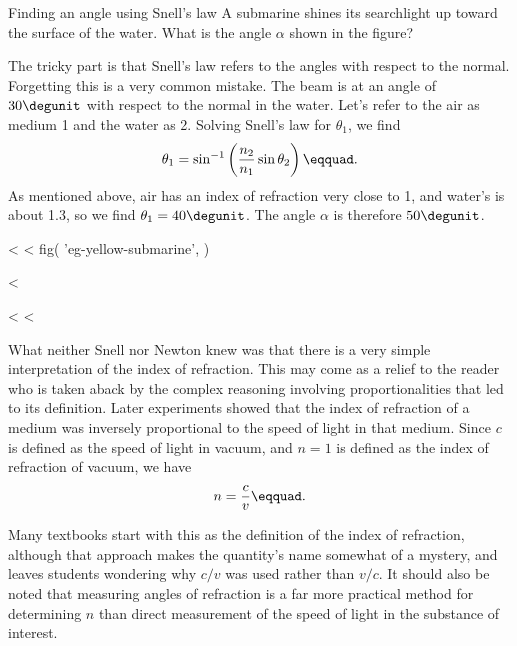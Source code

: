 \begin{eg}{Finding an angle using Snell's law}\label{eg:yellow-submarine}
\egquestion A submarine shines its searchlight up toward the
surface of the water. What is the angle $\alpha $ shown in the figure?

\eganswer The tricky part is that Snell's law refers to the
angles with respect to the normal. Forgetting this is a very
common mistake. The beam is at an angle of $30\degunit$ with
respect to the normal in the water. Let's refer to the air
as medium 1 and the water as 2. Solving Snell's law
for $\theta_1$, we find
\begin{equation*}
                \theta_1         = \sin^{-1}\left(\frac{n_2}{n_1}\sin\theta_2\right)\eqquad.
\end{equation*}
As mentioned above, air has an index of refraction very
close to 1, and water's is about 1.3, so we find $\theta_1=40\degunit$.
The angle $\alpha $ is therefore $50\degunit$.
\end{eg}
<%
<%
  fig(
    'eg-yellow-submarine',
  )

<%

<%
<%

What neither Snell nor Newton knew was that there is a very
simple interpretation of the index of refraction. This may
come as a relief to the reader who is taken aback by the
complex reasoning involving proportionalities that led to
its definition. Later experiments showed that the index of
refraction of a medium was inversely proportional to the
speed of light in that medium. Since $c$ is defined as the
speed of light in vacuum, and $n=1$ is defined as the index
of refraction of vacuum, we have
\begin{equation*}
        n=\frac{c}{v}\eqquad.
\end{equation*}
\begin{longnoteafterequation}
[$n=$ medium's index of refraction, $v=$ speed of
light in that medium, $c=$ speed of light in a vacuum]
\end{longnoteafterequation}

Many textbooks start with this as the definition of the
index of refraction, although that approach makes the
quantity's name somewhat of a mystery, and leaves students
wondering why $c/v$ was used rather than $v/c$. It should
also be noted that measuring angles of refraction is a far
more practical method for determining $n$ than direct
measurement of the speed of light in the substance of interest.

